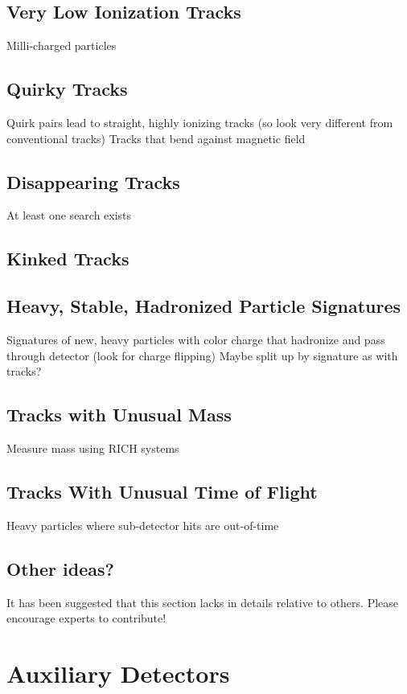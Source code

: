 \subsection{Very Low Ionization Tracks}

Milli-charged particles

\subsection{Quirky Tracks}
Quirk pairs lead to straight, highly ionizing tracks (so look very different from conventional tracks)
Tracks that bend against magnetic field

\subsection{Disappearing Tracks}
At least one search exists

\subsection{Kinked Tracks}

\subsection{Heavy, Stable, Hadronized Particle Signatures}
Signatures of new, heavy particles with color charge that hadronize and pass through detector (look for charge flipping)
Maybe split up by signature as with tracks?

\subsection{Tracks with Unusual Mass}
Measure mass using RICH systems

\subsection{Tracks With Unusual Time of Flight}
Heavy particles where sub-detector hits are out-of-time

\subsection{Other ideas?}
It has been suggested that this section lacks in details relative to others. Please encourage experts to contribute!

\section{Auxiliary Detectors}

